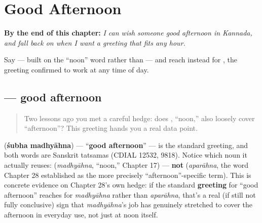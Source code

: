 
\chapter{Good Afternoon}
\label{ch:ka-good-afternoon}

\begin{chapteropening}
\textbf{By the end of this chapter:} \emph{I can wish someone good afternoon in Kannada, and fall back on  when I want a greeting that fits any hour.}

Say   — built on the \textquotedblleft{}noon\textquotedblright{} word rather than  — and reach instead for , the greeting confirmed to work at any time of day.
\end{chapteropening}

\section[\texorpdfstring{\kn{ಶುಭ} \kn{ಮಧ್ಯಾಹ್ನ} (śubha madhyāhna)}{ಶುಭ ಮಧ್ಯಾಹ್ನ (śubha madhyāhna)}]{  — good afternoon}

\label{lesson:KA-C31-shubha-madhyahna}



\begin{quote}
Two lessons ago you met a careful hedge: does , \textquotedblleft{}noon,\textquotedblright{} also loosely cover \textquotedblleft{}afternoon\textquotedblright{}? This greeting hands you a real data point.
\end{quote}

\begin{cousinweb}
\textbf{ } (\textbf{śubha madhyāhna}) — \textquotedblleft{}\textbf{good afternoon}\textquotedblright{} — is the standard greeting, and both words are Sanskrit tatsamas (CDIAL 12532, 9818). Notice which noun it actually reuses: \textbf{} (\emph{madhyāhna}, \textquotedblleft{}noon,\textquotedblright{} Chapter 17) — \textbf{not} \textbf{} (\emph{aparāhna}, the word Chapter 28 established as the more precisely \textquotedblleft{}afternoon\textquotedblright{}-specific term). This is concrete evidence on Chapter 28's own hedge: if the standard \textbf{greeting} for \textquotedblleft{}good afternoon\textquotedblright{} reaches for \emph{madhyāhna} rather than \emph{aparāhna}, that's a real (if still not fully conclusive) sign that \emph{madhyāhna}'s job has genuinely stretched to cover the afternoon in everyday use, not just at noon itself.
\end{cousinweb}

